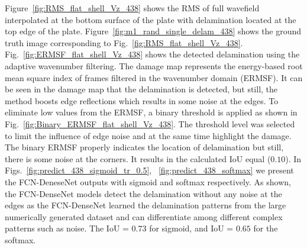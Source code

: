 Figure~\ref{fig:RMS_flat_shell_Vz_438} shows the RMS of full wavefield interpolated at the bottom surface of the plate with delamination located at the top edge of the plate.
Figure~\ref{fig:m1_rand_single_delam_438} shows the ground truth image corresponding to Fig.~\ref{fig:RMS_flat_shell_Vz_438}. 
Fig.~\ref{fig:ERMSF_flat_shell_Vz_438} shows the detected delamination using the adaptive wavenumber filtering. 
The damage map represents the energy-based root mean square index of frames filtered in the wavenumber domain (ERMSF). 
It can be seen in the damage map that the delamination is detected, but still, the method boosts edge reflections which results in some noise at the edges. 
To eliminate low values from the ERMSF, a binary threshold is applied as shown in Fig.~\ref{fig:Binary_ERMSF_flat_shell_Vz_438}.
The threshold level was selected to limit the influence of edge noise and at the same time highlight the damage. 
The binary ERMSF properly indicates the location of delamination but still, there is some noise at the corners.
It results in the calculated IoU equal (\(0.10\)).
In Figs.~\ref{fig:predict_438_sigmoid_tr_0.5}, ~\ref{fig:predict_438_softmax} we present the FCN-DeneseNet outputs with sigmoid and softmax respectively.
As shown, the FCN-DenseNet models detect the delamination without any noise at the edges as the FCN-DenseNet learned the delamination patterns from the large numerically generated dataset and can differentiate among different complex patterns such as noise.   
The IoU = \(0.73\) for sigmoid, and IoU = \(0.65\) for the softmax.

